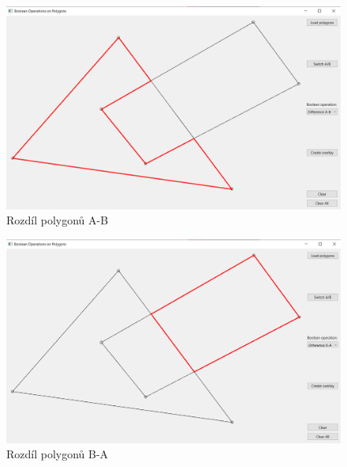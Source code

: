 \documentclass[11pt]{article}
\begin{document}
\begin{figure}[htbh]
	\centering
	\captionsetup{justification=centering}
	\includegraphics[scale=0.42]{images/vystup_diffAB.png} 
	\caption{Rozdíl polygonů A-B}	
	\label{fig:vystup_diffAB}
\end{figure} 
\begin{figure}[htbh]
	\centering
	\captionsetup{justification=centering}
	\includegraphics[scale=0.42]{images/vystup_diffBA.png} 
	\caption{Rozdíl polygonů B-A}	
	\label{fig:vystup_diffBA}
\end{figure} 
\clearpage
\end{document}
